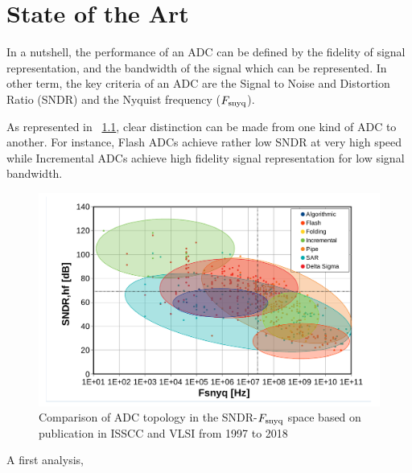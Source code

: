 
\chapter{State of the Art}
\label{sec:soa}
\ifpdf
    \graphicspath{{Chapter2/Figs/Raster/}{Chapter2/Figs/PDF/}{Chapter2/Figs/}}
\else
    \graphicspath{{Chapter2/Figs/Vector/}{Chapter2/Figs/}}
\fi

In a nutshell, the performance of an ADC can be defined by the fidelity of signal representation, and the bandwidth of the signal which can be represented. In other term, the key criteria of an ADC are the Signal to Noise and Distortion Ratio (SNDR) and the Nyquist frequency ($F_{\rm snyq}$).

As represented in \figurename~\ref{fig:topology-sndr-fsnyq-comparison}, clear distinction can be made from one kind of ADC to another. For instance, Flash ADCs achieve rather low SNDR at very high speed while Incremental ADCs achieve high fidelity signal representation for low signal bandwidth. 

\begin{figure}[htp]
    \centering
    \includegraphics[width=.8\textwidth]{Chapter2/Figs/Vector/sndr_fsnyq_topology.pdf}
    \caption{Comparison of ADC topology in the SNDR-$F_{\rm snyq}$ space based on publication in ISSCC and VLSI from 1997 to 2018}
    \label{fig:topology-sndr-fsnyq-comparison}
\end{figure}

A first analysis, 

